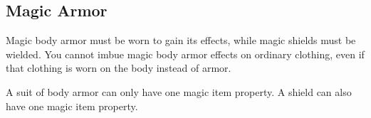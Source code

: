 

\begin{longcolumn}
  \section{Magic Armor}\label{Magic Armor}
    \begin{longtablepreface}
      Magic body armor must be worn to gain its effects, while magic shields must be wielded.
      You cannot imbue magic body armor effects on ordinary clothing, even if that clothing is worn on the body instead of armor.

       A suit of body armor can only have one magic item property.
      A shield can also have one magic item property.
    \end{longtablepreface}

    

\end{longcolumn}




